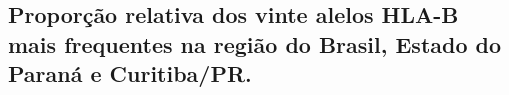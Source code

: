 

\newpage

\vspace*{4cm}
\vspace*{\fill}
\vspace*{\fill}
\vfill

\newpage

\label{appendixA}

\begin{justifying}
\section{Proporção relativa dos vinte alelos HLA-B mais frequentes na região do Brasil, Estado do Paraná e Curitiba/PR.}



\end{justifying}
